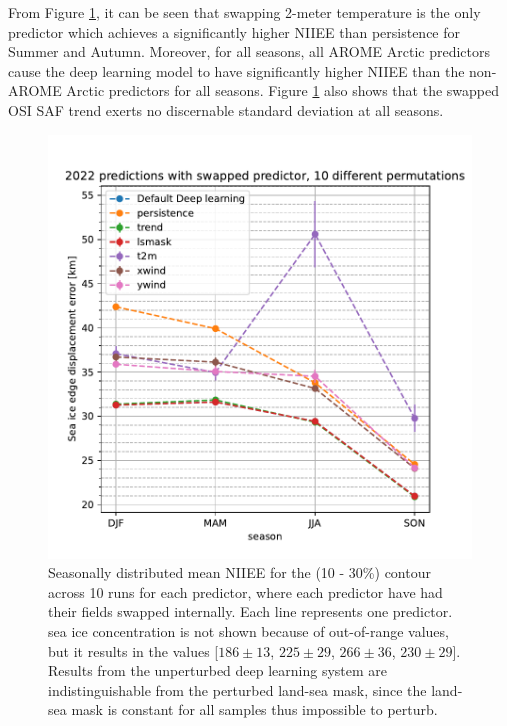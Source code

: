 \documentclass[../main/thesis.tex]{subfiles}
\begin{document}
From Figure \ref{fig:swapped}, it can be seen that swapping 2-meter temperature is the only predictor which achieves a significantly higher NIIEE than persistence for Summer and Autumn. Moreover, for all seasons, all AROME Arctic predictors cause the deep learning model to have significantly higher NIIEE than the non-AROME Arctic predictors for all seasons. Figure \ref{fig:swapped} also shows that the swapped OSI SAF trend exerts no discernable standard deviation at all seasons.


\begin{figure}
    \centering
    \includegraphics[width=\textwidth]{swapped.pdf}
    \caption{\label{fig:swapped}Seasonally distributed mean NIIEE for the (10 - 30\%) contour across 10 runs for each predictor, where each predictor have had their fields swapped internally. Each line represents one predictor. sea ice concentration is not shown because of out-of-range values, but it results in the values [$186 \pm 13$, $225 \pm 29$, $266 \pm 36$, $230 \pm 29$]. Results from the unperturbed deep learning system are indistinguishable from the perturbed land-sea mask, since the land-sea mask is constant for all samples thus impossible to perturb.}
\end{figure}
\end{document}
